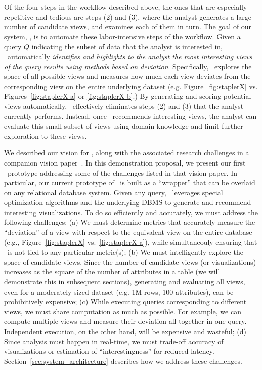 Of the four steps in the workflow described above, the 
ones that are especially repetitive and tedious are steps (2) and (3),
where the analyst generates a large number of candidate views, and examines each
of them in turn. The goal of our system, \SeeDB, is to automate these
labor-intensive steps of the workflow. Given a query $Q$ indicating the subset
of data that the analyst is interested in, \SeeDB\ automatically {\em identifies and highlights to the analyst the most
interesting views of the query results using methods based on
deviation}. Specifically, \SeeDB\ explores the space of all possible views and
measures how much each view deviates from the corresponding view on the
entire underlying dataset (e.g. Figure~\ref{fig:staplerX} vs.
Figures~\ref{fig:staplerX-a} or \ref{fig:staplerX-b}.) By generating and
scoring potential views automatically, \SeeDB\ effectively eliminates
steps (2) and (3) that the analyst currently performs. Instead, once \SeeDB\
recommends interesting views, the analyst can evaluate this small
subset of views using domain knowledge and limit further
exploration to these views.  


We described our vision for \SeeDB, along with the associated research
challenges in a companion vision paper~\cite{DBLP:conf/vldb/Parameswaran2013}.
In this demonstration proposal, we present our first \SeeDB\ prototype
addressing some of the challenges listed in that vision paper.
In particular, our current prototype of \SeeDB\ is built as a ``wrapper'' that
can be overlaid on any relational database system. Given any query, \SeeDB\
leverages special optimization algorithms and the underlying DBMS to generate
and recommend interesting visualizations. To do so efficiently and accurately,
we must address the following challenges:
(a) We must determine metrics that accurately measure the ``deviation'' of a
view with respect to the equivalent view on the entire database (e.g.,
Figure~\ref{fig:staplerX} vs.~\ref{fig:staplerX-a}), while simultaneouly
ensuring that \SeeDB\ is not tied to any particular metric(s); (b) We must
intelligently explore the space of candidate views. Since the number of
candidate views (or visualizations) increases as the square of the number of
attributes in a table (we will demonstrate this in subsequent sections),
generating and evaluating all views, even for a moderately sized dataset (e.g.
1M rows, 100 attributes), can be prohibitively expensive;
(c) While executing queries corresponding to different views, we must share
computation as much as possible. For example, 
we can compute multiple views and measure their deviation 
all together in one query. Independent execution,
on the other hand, will be expensive and wasteful;
(d) Since
analysis must happen in real-time, we must trade-off accuracy
of visualizations or estimation of ``interestingness'' for reduced latency.
Section~\ref{sec:system_architecture} describes how we address these challenges.



